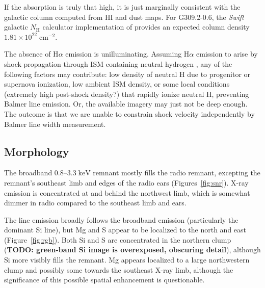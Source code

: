 \documentclass[preprint2,tighten,trackchanges]{aastex6}
\newcommand*{\mt}{\mathrm}
\newcommand*{\unit}[1]{\;\mt{#1}}  %
\newcommand*{\abt}{\mathord{\sim}} %
\newcommand*{\nH}{N_{\mathrm{H}}}
\newcommand*{\nHUnits}{\times 10^{22} \unit{cm^{-2}}}
\newcommand*{\AV}{A_{\mathrm{V}}}
\begin{document}
If the absorption is truly that high, it is just marginally consistent with
the galactic column computed from HI and dust maps.
For G309.2-0.6, the \textit{Swift} galactic $\nH$ calculator implementation of
\citet{willingale2013} provides an expected column density $1.81 \nHUnits$.

The absence of H$\alpha$ emission is unilluminating.
Assuming H$\alpha$ emission to arise by shock propagation through ISM
containing neutral hydrogen \citep{chevalier1978},  %
any of the following factors may contribute: low density of neutral H due to
progenitor or supernova ionization, low ambient ISM density, or some local
conditions (extremely high post-shock density?) that rapidly ionize neutral H,
preventing Balmer line emission.
Or, the available imagery may just not be deep enough.
The outcome is that we are unable to constrain shock velocity independently by
Balmer line width measurement.


\subsection{Morphology}

The broadband $0.8$--$3.3 \unit{keV}$ remnant mostly fills the radio remnant,
excepting the remnant's southeast limb and edges of the radio ears
(Figures~\ref{fig:snr}).
X-ray emission is concentrated at and behind the northwest limb, which is
somewhat dimmer in radio compared to the southeast limb and ears.

The line emission broadly follows the broadband emission (particularly the
dominant Si line), but Mg and S appear to be localized to the north and east
(Figure~\ref{fig:rgb}).
Both Si and S are concentrated in the northern clump (\textbf{TODO:
green-band Si image is overexposed, obscuring detail}), although Si more
visibly fills the remnant.
Mg appears localized to a large northwestern clump and possibly some towards
the southeast X-ray limb, although the significance of this possible spatial
enhancement is questionable.
\end{document}
